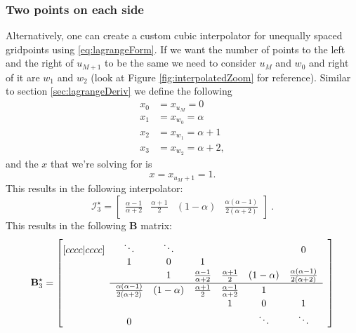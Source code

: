 \documentclass[dvipsnames]{article}
\begin{document}
\subsubsection*{Two points on each side}
Alternatively, one can create a custom cubic interpolator for unequally spaced gridpoints using \eqref{eq:lagrangeForm}. If we want the number of points to the left and the right of $u_{M+1}$ to be the same we need to consider $u_M$ and $w_0$ and right of it are $w_1$ and $w_2$ (look at Figure \ref{fig:interpolatedZoom} for reference). Similar to section \ref{sec:lagrangeDeriv} we define the following 
\begin{equation}
    \begin{aligned}
     x_0 &= x_{u_{M}} = 0 \\
     x_1 &= x_{w_0} = \alpha \\
     x_2& = x_{w_1} = \alpha + 1 \\
     x_3 &= x_{w_2} = \alpha + 2,
    \end{aligned}
\end{equation}
and the $x$ that we're solving for is 
\begin{equation}
    x = x_{u_M+1} = 1.
\end{equation}
This results in the following interpolator:
\begin{equation}
    \mathcal{I}_3^\star = 
    \begin{bmatrix}
        \frac{\alpha - 1}{\alpha + 2} &
        \frac{\alpha + 1}{2}&
       (1-\alpha) &
       \frac{\alpha(\alpha - 1)}{2(\alpha + 2)}
    \end{bmatrix}\ .
\end{equation}
This results in the following $\mathbf{B}$ matrix:
\begin{equation}
    \mathbf{B}_3^\star = \begin{bmatrix}[cccc|cccc]
     & \ddots  &\ddots & & & & 0 & \\
       & 1 & 0 & 1 & & & & \\
      & & 1 & \frac{\alpha - 1}{\alpha + 2} & \frac{\alpha + 1}{2} & (1-\alpha) &\frac{\alpha(\alpha - 1)}{2(\alpha + 2)} \\ \cline{2-7}
      & \frac{\alpha(\alpha - 1)}{2(\alpha + 2)} & (1-\alpha) & \frac{\alpha + 1}{2} & \frac{\alpha - 1}{\alpha + 2} & 1 & & \\
         & & & &1 & 0 & 1  \\
         & 0 & &  &  &\ddots & \ddots &
    \end{bmatrix}
\end{equation}
\end{document}
